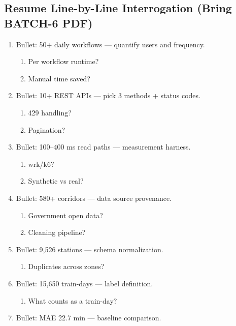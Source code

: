 \documentclass[9pt,a4paper]{article}
\begin{document}
\subsection{Resume Line-by-Line Interrogation (Bring BATCH-6 PDF)}
\begin{enumerate}[label=\textbf{Q\arabic*:}, leftmargin=*]
  \item Bullet: 50+ daily workflows --- quantify users and frequency.
  \begin{enumerate}[label=\textit{FU\arabic*:}, leftmargin=2em]
    \item Per workflow runtime?
    \item Manual time saved?
  \end{enumerate}
  \item Bullet: 10+ REST APIs --- pick 3 methods + status codes.
  \begin{enumerate}[label=\textit{FU\arabic*:}, leftmargin=2em]
    \item 429 handling?
    \item Pagination?
  \end{enumerate}
  \item Bullet: 100--400 ms read paths --- measurement harness.
  \begin{enumerate}[label=\textit{FU\arabic*:}, leftmargin=2em]
    \item wrk/k6?
    \item Synthetic vs real?
  \end{enumerate}
  \item Bullet: 580+ corridors --- data source provenance.
  \begin{enumerate}[label=\textit{FU\arabic*:}, leftmargin=2em]
    \item Government open data?
    \item Cleaning pipeline?
  \end{enumerate}
  \item Bullet: 9,526 stations --- schema normalization.
  \begin{enumerate}[label=\textit{FU\arabic*:}, leftmargin=2em]
    \item Duplicates across zones?
  \end{enumerate}
  \item Bullet: 15,650 train-days --- label definition.
  \begin{enumerate}[label=\textit{FU\arabic*:}, leftmargin=2em]
    \item What counts as a train-day?
  \end{enumerate}
  \item Bullet: MAE 22.7 min --- baseline comparison.

\end{enumerate}
\end{document}
